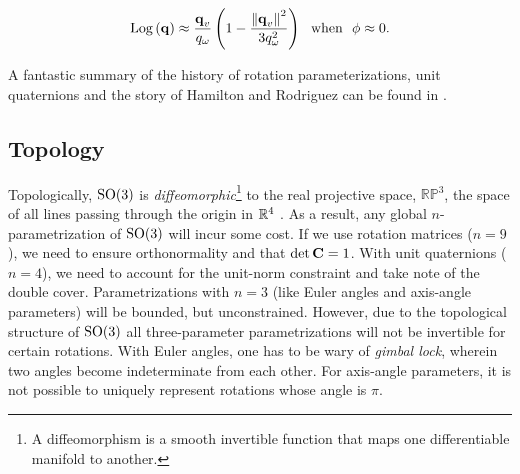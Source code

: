 \begin{equation}
	\mathrm{Log}\left({\boldsymbol{\mathbf{q}}}\right) \approx \frac{\boldsymbol{\mathbf{q}}_v}{q_\omega} \left( 1 - \frac{\left\Vert\boldsymbol{\mathbf{q}}_v\right\Vert^2}{3 q_\omega^2}\right) ~~ \textrm{when} ~~ \phi \approx 0. 
\end{equation}

A fantastic summary of the history of rotation parameterizations, unit quaternions and the story of Hamilton and Rodriguez can be found in \cite{Altmann1989-ru}.

\subsection{Topology}
Topologically, $\mathrm{SO}(3)$ is \textit{diffeomorphic}\footnote{A diffeomorphism is a smooth invertible function that maps one differentiable manifold to another.} to the real projective space, $\mathbb{RP}^3$, the space of all lines passing through the origin in $\RealNumbers^4$ \citep{Hartley2013-rc}. As a result, any global $n$-parametrization of $\mathrm{SO}(3)$ will incur some cost. If we use rotation matrices ($n = 9$), we need to ensure orthonormality and that $\det \boldsymbol{\mathbf{C}} = 1$. With unit quaternions ($n = 4$), we need to account for the unit-norm constraint and take note of the double cover. Parametrizations with $n=3$ (like Euler angles and axis-angle parameters) will be bounded, but unconstrained. However, due to the topological structure of $\mathrm{SO}(3)$ all three-parameter parametrizations will not be invertible for certain rotations. With Euler angles, one has to be wary of \textit{gimbal lock}, wherein two angles become indeterminate from each other. For axis-angle parameters, it is not possible to uniquely represent rotations whose angle is $\pi$. 
 
